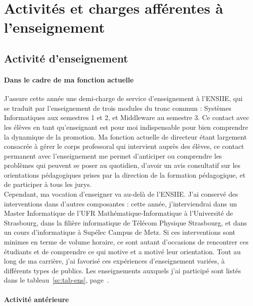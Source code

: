 \documentclass[11pt]{article}
\begin{document}
\section{Activités et charges afférentes à l'enseignement}
\label{sc:ensgnt-univ}

\subsection{Activité d'enseignement}

\paragraph{Dans le cadre de ma fonction actuelle}

J'assure cette année  une demi-charge de service d'enseignement  à l'ENSIIE, qui
se  traduit par  l'enseignement  de trois  modules du  tronc  commun :  Systèmes
Informatiques aux semestres 1 et 2, et Middleware au semestre 3. Ce contact avec
les élèves en tant qu'enseignant est pour moi indispensable pour bien comprendre
la dynamique de la promotion.  Ma fonction actuelle de directeur étant largement
consacrée à  gérer le  corps professoral  qui intervient  auprès des  élèves, ce
contact permanent  avec l'enseignement me  permet d'anticiper ou  comprendre les
problèmes qui peuvent se poser au quotidien, d'avoir un avis consultatif sur les
orientations  pédagogiques prises par la direction de la formation pédagogique, 
et de participer à tous les jurys.\\

Cependant, ma  vocation d'enseigner  va au-delà de  l'ENSIIE. J'ai  conservé des
interventions dans d'autres  composantes : cette année,  j'interviendrai dans un
Master  Informatique  de  l'UFR   Mathématique-Informatique  à  l'Université  de
Strasbourg, dans la filière informatique de Télécom Physique Strasbourg, et dans
un cours  d'informatique à Supélec  Campus de  Metz.  Si ces  interventions sont
minimes en terme de volume horaire, ce sont autant d'occasions de rencontrer ces
étudiants et de comprendre  ce qui motive et a motivé  leur orientation. Tout au
long de  ma carrière,  j'ai favorisé ces  expériences d'enseignement  variées, à
différents types  de publics.   Les enseignements  auxquels j'ai  participé sont
listés dans le tableau~\ref{sc:tab-ens}, page~\pageref{sc:tab-ens}.





\paragraph{Activité antérieure}
\end{document}
